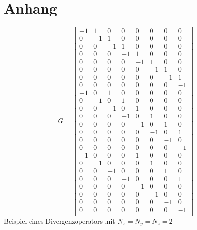 \chapter{Anhang}\label{sec:anhang}
\begin{equation*}
	G=
	\begin{bmatrix}
	-1& 1&	0&	0&	0&	0&	0&	0\\
	0&	-1&	1&	0&	0&	0&	0&	0\\
	0&	0&	-1&	1&	0&	0&	0&	0\\
	0&	0&	0&	-1&	1&	0&	0&	0\\
	0&	0&	0&	0&	-1&	1&	0&	0\\
	0&	0&	0&	0&	0&	-1&	1&	0\\
	0&	0&	0&	0&	0&	0&	-1&	1\\
	0&	0&	0&	0&	0&	0&	0&	-1\\
	-1&	0&	1&	0&	0&	0&	0&	0\\
	0&	-1&	0&	1&	0&	0&	0&	0\\
	0&	0&	-1&	0&	1&	0&	0&	0\\
	0&	0&	0&	-1&	0&	1&	0&	0\\
	0&	0&	0&	0&	-1&	0&	1&	0\\
	0&	0&	0&	0&	0&	-1&	0&	1\\
	0&	0&	0&	0&	0&	0&	-1&	0\\
	0&	0&	0&	0&	0&	0&	0&	-1\\
	-1&	0&	0&	0&	1&	0&	0&	0\\
	0&	-1&	0&	0&	0&	1&	0&	0\\
	0&	0&	-1&	0&	0&	0&	1&	0\\
	0&	0&	0&	-1&	0&	0&	0&	1\\
	0&	0&	0&	0&	-1&	0&	0&	0\\
	0&	0&	0&	0&	0&	-1&	0&	0\\
	0&	0&	0&	0&	0&	0&	-1&	0\\
	0&	0&	0&	0&	0&	0&	0&	-1\\
	\end{bmatrix}
\end{equation*}
Beispiel eines Divergenzoperators mit $N_x = N_y = N_z = 2$





